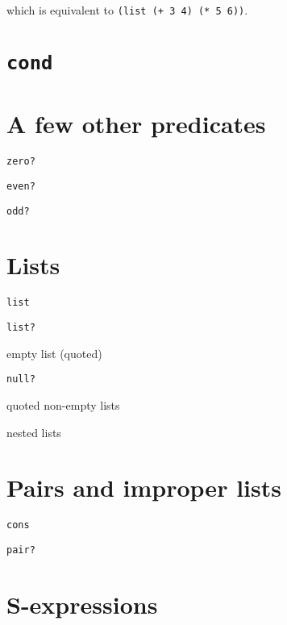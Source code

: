 \documentclass{book}
\begin{document}
\noindent
which is equivalent to \verb|(list (+ 3 4) (* 5 6))|.





\section{\texttt{cond}}

\section{A few other predicates}

\verb|zero?|

\verb|even?|

\verb|odd?|

\section{Lists}

\verb|list|

\verb|list?|

empty list (quoted)

\verb|null?|

quoted non-empty lists

nested lists




\section{Pairs and improper lists}

\verb|cons|

\verb|pair?|

\section{S-expressions}
\end{document}

